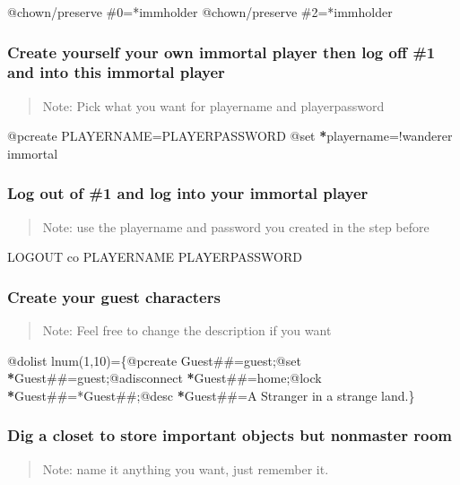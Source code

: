 \documentclass[letterpaper,10pt,english]{sphinxmanual}
\begin{document}
\sphinxAtStartPar
@chown/preserve \#0=*immholder
@chown/preserve \#2=*immholder


\subsubsection{Create yourself your own immortal player then log off \#1 and into this immortal player}
\label{\detokenize{gettingstarted:create-yourself-your-own-immortal-player-then-log-off-1-and-into-this-immortal-player}}\begin{quote}

\sphinxAtStartPar
Note: Pick what you want for playername and playerpassword
\end{quote}

\sphinxAtStartPar
@pcreate PLAYERNAME=PLAYERPASSWORD
@set {\color{red}\bfseries{}*}playername=!wanderer immortal


\subsubsection{Log out of \#1 and log into your immortal player}
\label{\detokenize{gettingstarted:log-out-of-1-and-log-into-your-immortal-player}}\begin{quote}

\sphinxAtStartPar
Note: use the playername and password you created in the step before
\end{quote}

\sphinxAtStartPar
LOGOUT
co PLAYERNAME PLAYERPASSWORD


\subsubsection{Create your guest characters}
\label{\detokenize{gettingstarted:create-your-guest-characters}}\begin{quote}

\sphinxAtStartPar
Note: Feel free to change the description if you want
\end{quote}

\sphinxAtStartPar
@dolist lnum(1,10)=\{@pcreate Guest\#\#=guest;@set {\color{red}\bfseries{}*}Guest\#\#=guest;@adisconnect {\color{red}\bfseries{}*}Guest\#\#=home;@lock {\color{red}\bfseries{}*}Guest\#\#=*Guest\#\#;@desc {\color{red}\bfseries{}*}Guest\#\#=A Stranger in a strange land.\}


\subsubsection{Dig a closet to store important objects but non\sphinxhyphen{}master room}
\label{\detokenize{gettingstarted:dig-a-closet-to-store-important-objects-but-non-master-room}}\begin{quote}

\sphinxAtStartPar
Note: name it anything you want, just remember it.
\end{quote}
\end{document}

